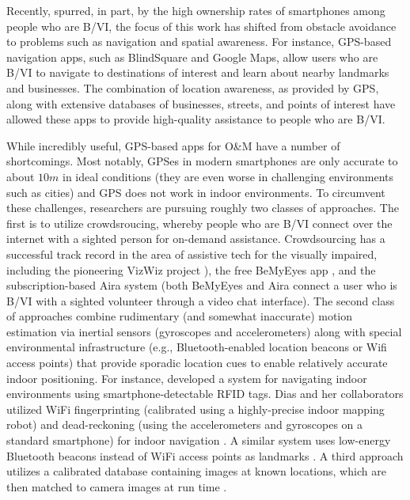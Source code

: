 \documentclass[chi_draft]{sigchi}
\newcommand{\BVI}{B/VI\xspace}
\newcommand{\OM}{O\&M\xspace}
\begin{document}
Recently, spurred, in part, by the high ownership rates of smartphones among people who are \BVI, the focus of this work has shifted from obstacle avoidance to problems such as navigation and spatial awareness.  For instance, GPS-based navigation apps, such as BlindSquare \cite{blindsquare} and Google Maps, allow users who are \BVI to navigate to destinations of interest and learn about nearby landmarks and businesses.  The combination of location awareness, as provided by GPS, along with extensive databases of businesses, streets, and points of interest have allowed these apps to provide high-quality assistance to people who are \BVI.

While incredibly useful, GPS-based apps for \OM have a number of shortcomings.  Most notably, GPSes in modern smartphones are only accurate to about $10m$ in ideal conditions (they are even worse in challenging environments such as cities) and GPS does not work in indoor environments.  To circumvent these challenges, researchers are pursuing roughly two classes of approaches.  The first is to utilize crowdsroucing, whereby people who are \BVI connect over the internet with a sighted person for on-demand assistance.  Crowdsourcing has a successful track record in the area of assistive tech for the visually impaired, including the pioneering VizWiz project \cite{bigham2010vizwiz}), the free BeMyEyes app \cite{bemyeyesaccessworld}, and the subscription-based Aira system \cite{aira} (both BeMyEyes and Aira connect a user who is \BVI with a sighted volunteer through a video chat interface).  The second class of approaches combine rudimentary (and somewhat inaccurate) motion estimation via inertial sensors (gyroscopes and accelerometers) along with special environmental infrastructure (e.g., Bluetooth-enabled location beacons or Wifi access points) that provide sporadic location cues to enable relatively accurate indoor positioning.  For instance, \cite{ganz2015percept, ganz2011percept, ganz2014percept} developed a system for navigating indoor environments using smartphone-detectable RFID tags.  Dias and her collaborators utilized WiFi fingerprinting (calibrated using a highly-precise indoor mapping robot) and dead-reckoning (using the accelerometers and gyroscopes on a standard smartphone) for indoor navigation \cite{Dias__2014_7778}.  A similar system uses low-energy Bluetooth beacons instead of WiFi access points as landmarks \cite{ishihara2017beacon, ahmetovic2016navcog, ahmetovic2017achieving}.  A third approach utilizes a calibrated database containing images at known locations, which are then matched to camera images at run time \cite{bai2014wearable}.
\end{document}

